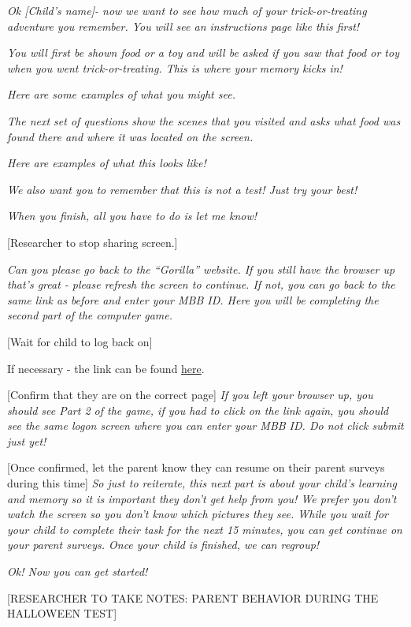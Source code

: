 \documentclass[]{book}
\begin{document}
\emph{Ok {[}Child's name{]}- now we want to see how much of your trick-or-treating adventure you remember. You will see an instructions page like this first!}

\emph{You will first be shown food or a toy and will be asked if you saw that food or toy when you went trick-or-treating. This is where your memory kicks in!}

\emph{Here are some examples of what you might see.}

\emph{The next set of questions show the scenes that you visited and asks what food was found there and where it was located on the screen.}

\emph{Here are examples of what this looks like!}

\emph{We also want you to remember that this is not a test! Just try your best!}

\emph{When you finish, all you have to do is let me know!}

{[}Researcher to stop sharing screen.{]}

\emph{Can you please go back to the ``Gorilla'' website. If you still have the browser up that's great - please refresh the screen to continue. If not, you can go back to the same link as before and enter your MBB ID. Here you will be completing the second part of the computer game.}

{[}Wait for child to log back on{]}

If necessary - the link can be found \href{https://research.sc/participant/login/20451/publicid}{here}.

{[}Confirm that they are on the correct page{]} \emph{If you left your browser up, you should see Part 2 of the game, if you had to click on the link again, you should see the same logon screen where you can enter your MBB ID. Do not click submit just yet!}

{[}Once confirmed, let the parent know they can resume on their parent surveys during this time{]} \emph{So just to reiterate, this next part is about your child's learning and memory so it is important they don't get help from you! We prefer you don't watch the screen so you don't know which pictures they see. While you wait for your child to complete their task for the next 15 minutes, you can get continue on your parent surveys. Once your child is finished, we can regroup!}

\emph{Ok! Now you can get started!}

{[}RESEARCHER TO TAKE NOTES: PARENT BEHAVIOR DURING THE HALLOWEEN TEST{]}
\end{document}
